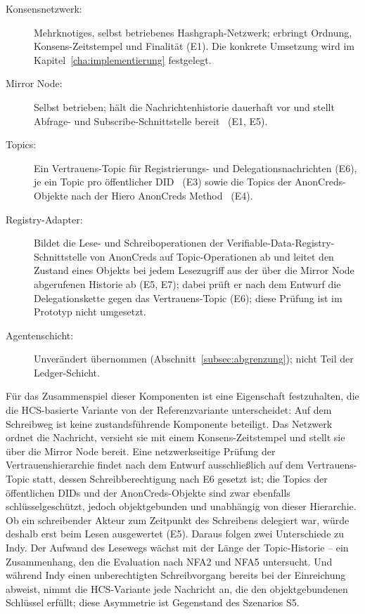 \begin{description}
  \item[Konsensnetzwerk:] Mehrknotiges, selbst betriebenes Hashgraph-Netzwerk; erbringt Ordnung, Konsens-Zeitstempel und Finalität (E1). Die konkrete Umsetzung wird im Kapitel~\ref{cha:implementierung} festgelegt.
  \item[Mirror Node:] Selbst betrieben; hält die Nachrichtenhistorie dauerhaft vor und stellt Abfrage- und Subscribe-Schnittstelle bereit~\cite{hederamirrornodes} (E1, E5).
  \item[Topics:] Ein Vertrauens-Topic für Registrierungs- und Delegationsnachrichten (E6), je ein Topic pro öffentlicher DID~\cite{hasheddidmethod} (E3) sowie die Topics der AnonCreds-Objekte nach der Hiero AnonCreds Method~\cite{hieroanoncreds} (E4).
  \item[Registry-Adapter:] Bildet die Lese- und Schreiboperationen der Verifiable-Data-Registry-Schnittstelle von AnonCreds auf Topic-Operationen ab und leitet den Zustand eines Objekts bei jedem Lesezugriff aus der über die Mirror Node abgerufenen Historie ab (E5, E7); dabei prüft er nach dem Entwurf die Delegationskette gegen das Vertrauens-Topic (E6); diese Prüfung ist im Prototyp nicht umgesetzt.
  \item[Agentenschicht:] Unverändert übernommen (Abschnitt~\ref{subsec:abgrenzung}); nicht Teil der Ledger-Schicht.
\end{description}

Für das Zusammenspiel dieser Komponenten ist eine Eigenschaft festzuhalten, die die HCS-basierte Variante von der Referenzvariante unterscheidet: Auf dem Schreibweg ist keine zustandsführende Komponente beteiligt. Das Netzwerk ordnet die Nachricht, versieht sie mit einem Konsens-Zeitstempel und stellt sie über die Mirror Node bereit. Eine netzwerkseitige Prüfung der Vertrauenshierarchie findet nach dem Entwurf ausschließlich auf dem Vertrauens-Topic statt, dessen Schreibberechtigung nach E6 gesetzt ist; die Topics der öffentlichen DIDs und der AnonCreds-Objekte sind zwar ebenfalls schlüsselgeschützt, jedoch objektgebunden und unabhängig von dieser Hierarchie. Ob ein schreibender Akteur zum Zeitpunkt des Schreibens delegiert war, würde deshalb erst beim Lesen ausgewertet (E5). Daraus folgen zwei Unterschiede zu Indy. Der Aufwand des Lesewegs wächst mit der Länge der Topic-Historie -- ein Zusammenhang, den die Evaluation nach NFA2 und NFA5 untersucht. Und während Indy einen unberechtigten Schreibvorgang bereits bei der Einreichung abweist, nimmt die HCS-Variante jede Nachricht an, die den objektgebundenen Schlüssel erfüllt; diese Asymmetrie ist Gegenstand des Szenarios S5.


